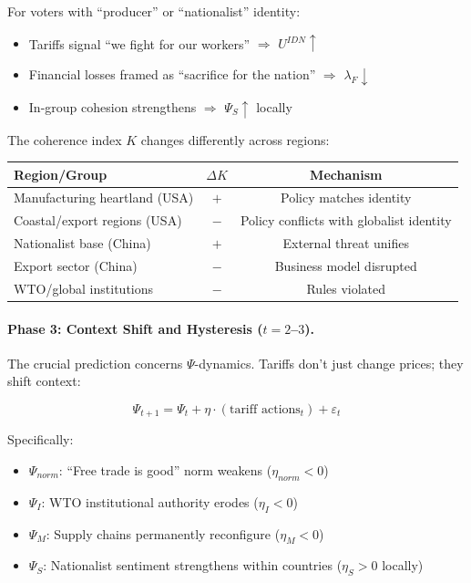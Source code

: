 For voters with ``producer'' or ``nationalist'' identity:
\begin{itemize}
  \item Tariffs signal ``we fight for our workers'' $\Rightarrow$ $U^{IDN} \uparrow$
  \item Financial losses framed as ``sacrifice for the nation'' $\Rightarrow$ $\lambda_F \downarrow$
  \item In-group cohesion strengthens $\Rightarrow$ $\Psi_S \uparrow$ locally
\end{itemize}

The coherence index $K$ changes differently across regions:

\begin{center}
\renewcommand{\arraystretch}{1.2}
\begin{tabular}{lcc}
\hline
\textbf{Region/Group} & \textbf{$\Delta K$} & \textbf{Mechanism} \\
\hline
Manufacturing heartland (USA) & $+$ & Policy matches identity \\
Coastal/export regions (USA) & $-$ & Policy conflicts with globalist identity \\
Nationalist base (China) & $+$ & External threat unifies \\
Export sector (China) & $-$ & Business model disrupted \\
WTO/global institutions & $-$ & Rules violated \\
\hline
\end{tabular}
\end{center}

\paragraph{Phase 3: Context Shift and Hysteresis ($t = 2$--$3$).}

The crucial prediction concerns $\Psi$-dynamics. Tariffs don't just change prices;
they shift context:

\begin{equation}
\Psi_{t+1} = \Psi_t + \eta \cdot (\text{tariff actions}_t) + \varepsilon_t
\label{eq:psi-dynamics-trade}
\end{equation}

Specifically:
\begin{itemize}
  \item $\Psi_{norm}$: ``Free trade is good'' norm weakens ($\eta_{norm} < 0$)
  \item $\Psi_I$: WTO institutional authority erodes ($\eta_I < 0$)
  \item $\Psi_M$: Supply chains permanently reconfigure ($\eta_M < 0$)
  \item $\Psi_S$: Nationalist sentiment strengthens within countries ($\eta_S > 0$ locally)
\end{itemize}

